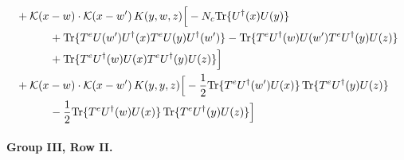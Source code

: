 \documentclass[10pt]{article}
\numberwithin{equation}{section}
\begin{document}
\begin{align}
&+\mathcal K(x-w)\cdot\mathcal K(x-w')\,K(y,w,z)\Big[-N_c{\rm Tr}\{U^\dagger(x)U(y)\}\notag\\
&\quad\quad\quad+{\rm Tr}\{T^eU(w')U^\dagger(x)T^eU(y)U^\dagger(w')\}-{\rm Tr}\{T^eU^\dagger(w)U(w')T^eU^\dagger(y)U(z)\}\notag\\
&\quad\quad\quad+{\rm Tr}\{T^eU^\dagger(w)U(x)T^eU^\dagger(y)U(z)\}\Big]\notag\\
&+\mathcal K(x-w)\cdot\mathcal K(x-w')\,K(y,y,z)\Big[-\frac{1}{2}{\rm Tr}\{T^eU^\dagger(w')U(x)\}\,{\rm Tr}\{T^eU^\dagger(y)U(z)\}\notag\\
&\quad\quad\quad-\frac{1}{2}{\rm Tr}\{T^eU^\dagger(w)U(x)\}\,{\rm Tr}\{T^eU^\dagger(y)U(z)\}\Big]
\label{eq:G3I}
\end{align}

\paragraph{Group III, Row II.}
\end{document}
